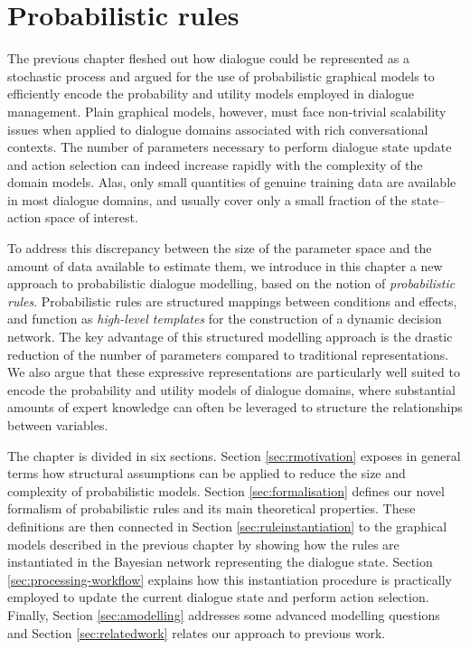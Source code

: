 \chapter{Probabilistic rules}
\label{chap:rules}

The previous chapter fleshed out how dialogue could be represented as a stochastic process and argued for the use of probabilistic graphical models to efficiently encode the probability and utility models employed in dialogue management. Plain graphical models, however, must face non-trivial scalability issues when applied to dialogue domains associated with rich conversational contexts. The number of parameters necessary to perform dialogue state update and action selection can indeed increase rapidly with the complexity of the domain models. Alas, only small quantities of genuine training data are available in most dialogue domains, and usually cover only a small fraction of the state--action space of interest. 

To address this discrepancy between the size of the parameter space and the amount of data available to estimate them, we introduce in this chapter a new approach to probabilistic dialogue modelling, based on the notion of \textit{probabilistic rules}.  Probabilistic rules are structured mappings between conditions and effects, and function as \textit{high-level templates} for the construction of a dynamic decision network.  The key advantage of this structured modelling approach is the drastic reduction of the number of parameters compared to traditional representations.  We also argue that these expressive representations are particularly well suited to encode the probability and utility models of dialogue domains, where substantial amounts of expert knowledge can often be leveraged to structure the relationships between variables. 

The chapter is divided in six sections. Section \ref{sec:rmotivation} exposes in general terms how structural assumptions can be applied to reduce the size and complexity of probabilistic models.  Section \ref{sec:formalisation} defines our novel formalism of probabilistic rules and its main theoretical properties.  These definitions are then connected in Section \ref{sec:ruleinstantiation} to the graphical models described in the previous chapter by showing how the rules are instantiated in the Bayesian network representing the dialogue state. Section \ref{sec:processing-workflow} explains how this instantiation procedure is practically employed to update the current dialogue state and perform action selection. Finally, Section \ref{sec:amodelling} addresses some advanced modelling questions and Section \ref{sec:relatedwork} relates our approach to previous work.


